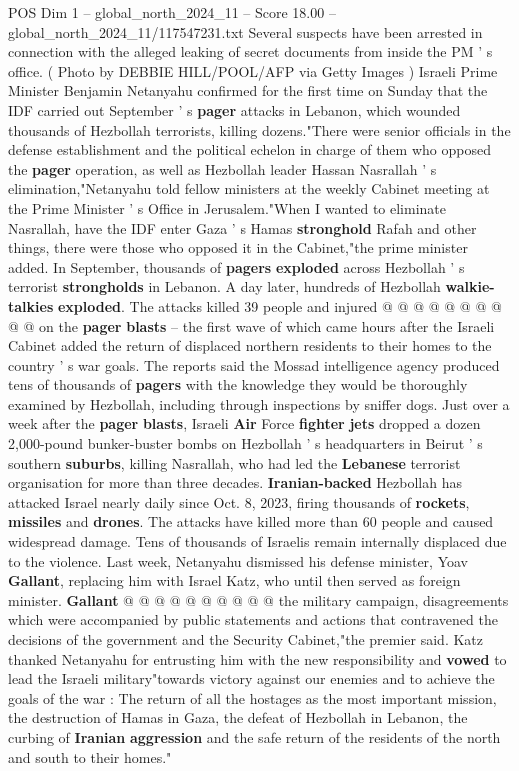 \begin{textsample}{POS Dim 1 – global\_north\_2024\_11 – Score 18.00 – global\_north\_2024\_11/117547231.txt}  \label{ex:f1_pos_238}
Several suspects have been arrested in connection with the alleged leaking of secret documents from inside the PM ' s office. ( Photo by DEBBIE HILL/POOL/AFP via Getty Images ) Israeli Prime Minister Benjamin Netanyahu confirmed for the first time on Sunday that the IDF carried out September ' s \textbf{pager} attacks in Lebanon, which wounded thousands of Hezbollah terrorists, killing dozens."There were senior officials in the defense establishment and the political echelon in charge of them who opposed the \textbf{pager} operation, as well as Hezbollah leader Hassan Nasrallah ' s elimination,"Netanyahu told fellow ministers at the weekly Cabinet meeting at the Prime Minister ' s Office in Jerusalem."When I wanted to eliminate Nasrallah, have the IDF enter Gaza ' s Hamas \textbf{stronghold} Rafah and other things, there were those who opposed it in the Cabinet,"the prime minister added.
In September, thousands of \textbf{pagers} \textbf{exploded} across Hezbollah ' s terrorist \textbf{strongholds} in Lebanon.
A day later, hundreds of Hezbollah \textbf{walkie-talkies} \textbf{exploded}.
The attacks killed 39 people and injured @ @ @ @ @ @ @ @ @ @ on the \textbf{pager} \textbf{blasts} -- the first wave of which came hours after the Israeli Cabinet added the return of displaced northern residents to their homes to the country ' s war goals.
The reports said the Mossad intelligence agency produced tens of thousands of \textbf{pagers} with the knowledge they would be thoroughly examined by Hezbollah, including through inspections by sniffer dogs.
Just over a week after the \textbf{pager} \textbf{blasts}, Israeli \textbf{Air} Force \textbf{fighter} \textbf{jets} dropped a dozen 2,000-pound bunker-buster bombs on Hezbollah ' s headquarters in Beirut ' s southern \textbf{suburbs}, killing Nasrallah, who had led the \textbf{Lebanese} terrorist organisation for more than three decades. \textbf{Iranian-backed} Hezbollah has attacked Israel nearly daily since Oct. 8, 2023, firing thousands of \textbf{rockets}, \textbf{missiles} and \textbf{drones}.
The attacks have killed more than 60 people and caused widespread damage.
Tens of thousands of Israelis remain internally displaced due to the violence.
Last week, Netanyahu dismissed his defense minister, Yoav \textbf{Gallant}, replacing him with Israel Katz, who until then served as foreign minister. \textbf{Gallant} @ @ @ @ @ @ @ @ @ @ the military campaign, disagreements which were accompanied by public statements and actions that contravened the decisions of the government and the Security Cabinet,"the premier said.
Katz thanked Netanyahu for entrusting him with the new responsibility and \textbf{vowed} to lead the Israeli military"towards victory against our enemies and to achieve the goals of the war : The return of all the hostages as the most important mission, the destruction of Hamas in Gaza, the defeat of Hezbollah in Lebanon, the curbing of \textbf{Iranian} \textbf{aggression} and the safe return of the residents of the north and south to their homes."


\end{textsample}
